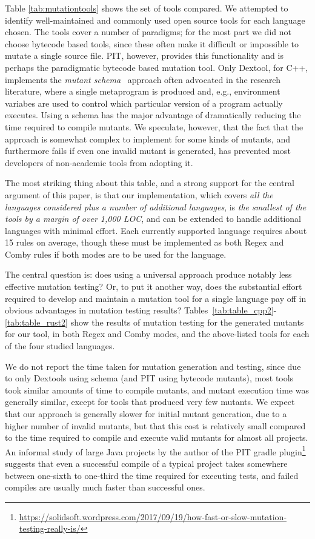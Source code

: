 \documentclass[sigconf,review, anonymous]{acmart}
\begin{document}
{Table \ref{tab:mutationtools} shows the set of tools compared.  We
attempted to identify well-maintained and commonly used open
source tools for each
language chosen.  The tools cover a number of paradigms; for the most
part we did not choose bytecode based tools, since these often make it
difficult or impossible to mutate a single source file.  PIT, however,
provides this functionality and is perhaps the paradigmatic bytecode
based mutation tool.  Only Dextool, for C++, implements the
\emph{mutant schema}~\cite{untch1993mutation} approach often advocated
in the research literature, where a single metaprogram is produced
and, e.g., environment variabes are used to control which particular
version of a program actually executes.  Using a schema has the major
advantage of dramatically reducing the time required to compile
mutants.  We speculate, however, that the fact that the approach is
somewhat complex to implement for some kinds of mutants, and
furthermore fails if even one invalid mutant is generated, has
prevented most developers of non-academic tools from adopting it.

The most striking thing about this table, and a strong support for
the central argument of this paper, is that our implementation, which
covers \emph{all the languages considered plus a number of additional
languages}, is \emph{the smallest of the tools by a margin of over 1,000 LOC},
and can be extended to handle additional languages with minimal
effort.  Each currently supported language requires about 15 rules on
average, though these must be implemented as both Regex and Comby
rules if both modes are to be used for the language.

The central question is: does using a universal approach produce
notably less effective mutation testing?  Or, to put it another way,
does the substantial effort required to develop and maintain a
mutation tool for a single language pay off in obvious advantages in
mutation testing results?
Tables~\ref{tab:table_cpp2}-\ref{tab:table_rust2} show the results of
mutation testing for the generated mutants for our tool, in both Regex
and Comby modes, and the above-listed tools for each of the four
studied languages.

We do not report the time taken for mutation generation and testing,
since due to only Dextools using schema (and PIT using bytecode mutants), most tools took similar
amounts of time to compile mutants, and mutant execution time was
generally similar, except for tools that produced very few mutants.
We expect that our approach is generally slower for initial mutant
generation, due to a higher number of invalid mutants, but that this
cost is relatively small compared to the time required to compile and
execute valid mutants for almost all projects.  An informal study of
large Java projects by the author of the PIT gradle
plugin\footnote{\url{https://solidsoft.wordpress.com/2017/09/19/how-fast-or-slow-mutation-testing-really-is/}}
  suggests that even a successful compile of a typical project takes
  somewhere between one-sixth to one-third the time required for
  executing tests, and failed compiles are usually much
  faster than successful ones.

}
\end{document}
